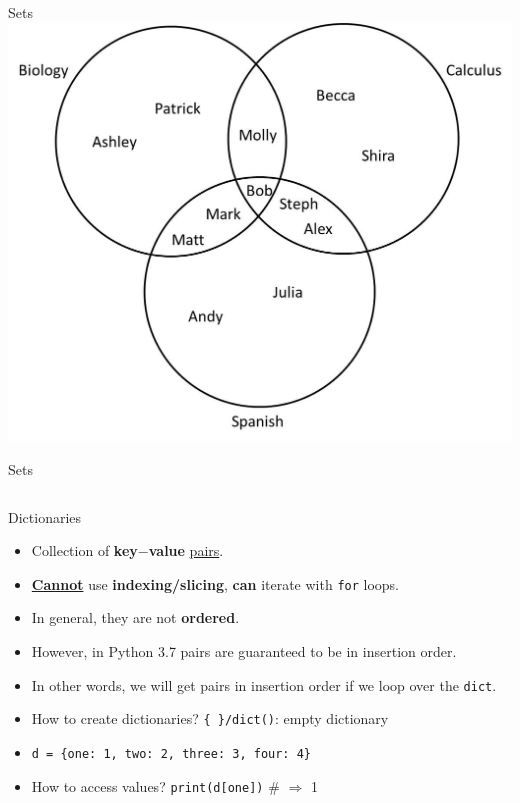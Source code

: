     \begin{frame}{Sets}
        \centering
        \includegraphics[height=0.75\textheight]{../Lecture6/images/venn.jpg}
    \end{frame}
    
    \begin{frame}{Sets}
        \inputminted[frame=single,framesep=2pt]{python3}{../Lecture6/code-examples/sets.py}
    \end{frame}
    

    \begin{frame}{Dictionaries}
        \LARGE
        \begin{itemize}
            \item Collection of \textbf{key$-$value} \underline{pairs}.
            \pause
            \item \underline{\textbf{Cannot}} use \textbf{indexing/slicing}, \textbf{can} iterate with \texttt{for} loops. 
            \pause
            \item In general, they are not \textbf{ordered}. 
            \pause
            \item However, in Python 3.7 pairs are guaranteed to be in insertion order.
            \pause
            \item In other words, we will get pairs in insertion order if we loop over the \texttt{dict}.
            \pause
            \item How to create dictionaries?
            \pause
             \texttt{\{\ \}/dict()}: empty dictionary
            \pause
            \item \texttt{d = \{\textquotesingle one\textquotesingle : 1, \textquotesingle two\textquotesingle : 2, \textquotesingle three\textquotesingle : 3, \textquotesingle four\textquotesingle : 4\}}
            \pause
            \item How to access values? 
            \pause
             \texttt{print(d[\textquotesingle one\textquotesingle ])} \# $\Rightarrow$ 1
        \end{itemize}
    \end{frame}

